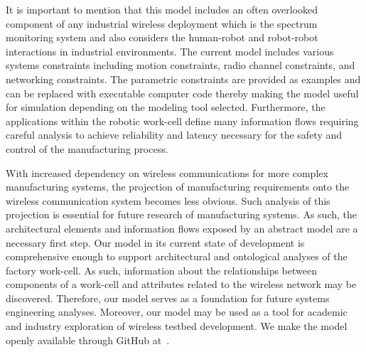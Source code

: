 It is important to mention that this model includes an often overlooked component of any industrial wireless deployment which is the spectrum monitoring system and also considers the human-robot and robot-robot interactions in industrial environments. The current model includes various systems constraints including motion constraints, radio channel constraints, and networking constraints. The parametric constraints are provided as examples and can be replaced with executable computer code thereby making the model useful for simulation depending on the modeling tool selected. Furthermore, the applications within the robotic work-cell define many information flows requiring careful analysis to achieve reliability and latency necessary for the safety and control of the manufacturing process.

With increased dependency on wireless communications for more complex manufacturing systems, the projection of manufacturing requirements onto the wireless communication system becomes less obvious. Such analysis of this projection is essential for future research of manufacturing systems. As such, the architectural elements and information flows exposed by an abstract model
are a necessary first step. Our model in its current state of development is comprehensive enough to support architectural and ontological analyses of the factory work-cell.  As such, information about the relationships between components of a work-cell and attributes related to the wireless network may be discovered. Therefore, our model serves as a foundation for future systems engineering analyses. Moreover, our model may be used as a tool for academic and industry exploration of wireless testbed development.  We make the model openly available through GitHub at~\cite{SysML.Candell2018}.


